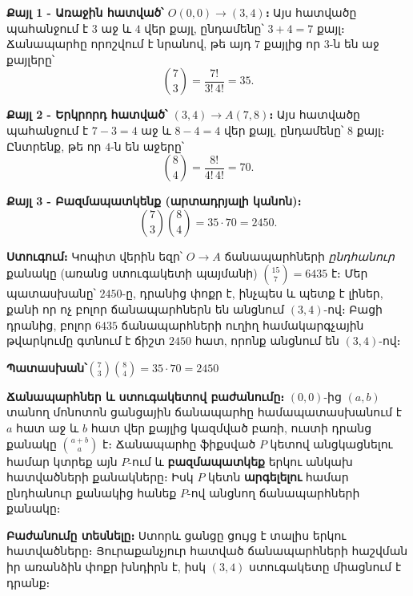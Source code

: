 \documentclass[11pt,a4paper]{article}
\newcommand{\answer}[1]{\begin{answerbox}\centering\textbf{Պատասխան՝}\quad #1\end{answerbox}}
\begin{document}
\textbf{Քայլ 1 - Առաջին հատված՝ $O(0,0)\to(3,4)$։}
Այս հատվածը պահանջում է $3$ աջ և $4$ վեր քայլ, ընդամենը՝ $3+4=7$ քայլ։ Ճանապարհը որոշվում է նրանով,
թե այդ $7$ քայլից որ $3$-ն են աջ քայլերը՝
$$\binom{7}{3}=\frac{7!}{3!\,4!}=35.$$

\textbf{Քայլ 2 - Երկրորդ հատված՝ $(3,4)\to A(7,8)$։}
Այս հատվածը պահանջում է $7-3=4$ աջ և $8-4=4$ վեր քայլ, ընդամենը՝ $8$ քայլ։ Ընտրենք, թե որ $4$-ն են
աջերը՝
$$\binom{8}{4}=\frac{8!}{4!\,4!}=70.$$

\textbf{Քայլ 3 - Բազմապատկենք (արտադրյալի կանոն)։}
$$\binom{7}{3}\binom{8}{4}=35\cdot 70=2450.$$

\textbf{Ստուգում։} Կոպիտ վերին եզր՝ $O\to A$ ճանապարհների \emph{ընդհանուր} քանակը (առանց
ստուգակետի պայմանի) $\binom{15}{7}=6435$ է։ Մեր պատասխանը՝ $2450$-ը, դրանից փոքր է, ինչպես և պետք է
լիներ, քանի որ ոչ բոլոր ճանապարհներն են անցնում $(3,4)$-ով։ Բացի դրանից, բոլոր $6435$ ճանապարհների
ուղիղ համակարգչային թվարկումը գտնում է ճիշտ $2450$ հատ, որոնք անցնում են $(3,4)$-ով։ \checkmark

\answer{$\displaystyle \binom{7}{3}\binom{8}{4}=35\cdot 70=2450$}

\begin{methodbox}
\textbf{Ճանապարհներ և ստուգակետով բաժանումը։} $(0,0)$-ից $(a,b)$ տանող մոնոտոն
ցանցային ճանապարհը համապատասխանում է $a$ հատ աջ և $b$ հատ վեր քայլից կազմված բառի, ուստի դրանց
քանակը $\binom{a+b}{a}$ է։ Ճանապարհը ֆիքսված $P$ կետով անցկացնելու համար կտրեք այն $P$-ում և
\textbf{բազմապատկեք} երկու անկախ հատվածների քանակները։ Իսկ $P$ կետն \textbf{արգելելու} համար
ընդհանուր քանակից հանեք $P$-ով անցնող ճանապարհների քանակը։
\end{methodbox}

\medskip
\textbf{Բաժանումը տեսնելը։} Ստորև ցանցը ցույց է տալիս երկու հատվածները։ Յուրաքանչյուր հատված ճանապարհների
հաշվման իր առանձին փոքր խնդիրն է, իսկ $(3,4)$ ստուգակետը միացնում է դրանք։

\begin{center}
\end{center}
\end{document}
